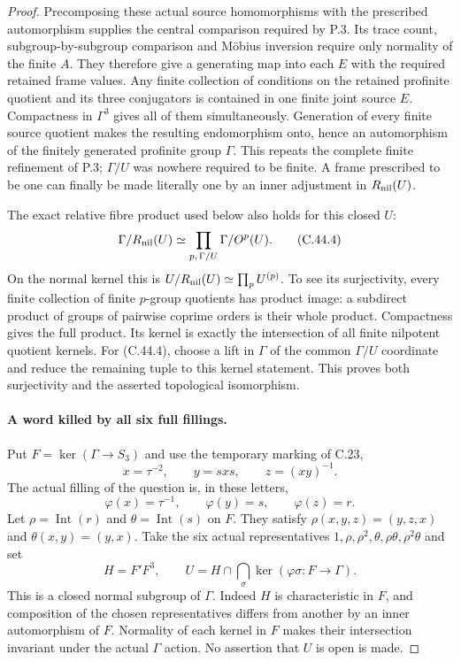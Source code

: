 \begin{proof}
Precomposing these actual source homomorphisms with the prescribed
automorphism supplies the central comparison required by P.3.
Its trace count, subgroup-by-subgroup comparison and M\"obius
inversion require only normality of the finite $A$. They therefore
give a generating map into each $E$ with the required retained
frame values. Any finite collection of conditions on the retained
profinite quotient and its three conjugators is contained in one
finite joint source $E$. Compactness in $\Gamma^3$ gives all of
them simultaneously. Generation of every finite source quotient
makes the resulting endomorphism onto, hence an automorphism of
the finitely generated profinite group $\Gamma$. This repeats the
complete finite refinement of P.3; $\Gamma/U$ was nowhere required
to be finite. A frame prescribed to be one can finally be made
literally one by an inner adjustment in $R_{\rm nil}(U)$.

The exact relative fibre product used below also holds for this
closed $U$:
\[
 \Gamma/R_{\rm nil}(U)
       \simeq\prod_{p,\,\Gamma/U}\Gamma/O^p(U).          \tag{C.44.4}
\]
On the normal kernel this is
$U/R_{\rm nil}(U)\simeq\prod_p U^{(p)}$. To see its
surjectivity, every finite collection of finite $p$-group
quotients has product image: a subdirect product of groups of
pairwise coprime orders is their whole product. Compactness gives
the full product. Its kernel is exactly the intersection of all
finite nilpotent quotient kernels. For (C.44.4), choose a lift in
$\Gamma$ of the common $\Gamma/U$ coordinate and reduce the
remaining tuple to this kernel statement. This proves both
surjectivity and the asserted topological isomorphism.

\paragraph{A word killed by all six full fillings.}
Put $F=\ker(\Gamma\to S_3)$ and use the temporary marking of C.23,
\[
 x=\tau^{-2},\qquad y=sxs,\qquad z=(xy)^{-1}.
\]
The actual filling of the question is, in these letters,
\[
 \varphi(x)=\tau^{-1},\qquad\varphi(y)=s,\qquad
                         \varphi(z)=r.                \tag{C.44.5}
\]
Let $\rho=\operatorname{Int}(r)$ and
$\theta=\operatorname{Int}(s)$ on $F$. They satisfy
$\rho(x,y,z)=(y,z,x)$ and $\theta(x,y)=(y,x)$.
Take the six actual representatives
$1,\rho,\rho^2,\theta,\rho\theta,\rho^2\theta$ and set
\[
 H=F'F^3,\qquad
 U=H\cap\bigcap_\sigma\ker(\varphi\sigma:F\to\Gamma).
                                                               \tag{C.44.6}
\]
This is a closed normal subgroup of $\Gamma$. Indeed $H$ is
characteristic in $F$, and composition of the chosen representatives
differs from another by an inner automorphism of $F$. Normality
of each kernel in $F$ makes their intersection invariant under
the actual $\Gamma$ action. No assertion that $U$ is open is made.


\end{proof}
